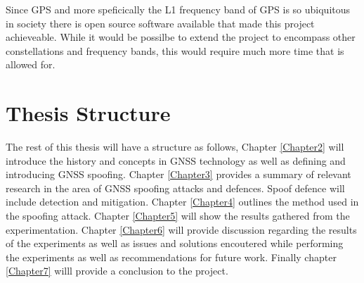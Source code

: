 Since GPS and more speficically the L1 frequency band of GPS is so ubiquitous in society there is open source software available that made this project achieveable. While
it would be possilbe to extend the project to encompass other constellations and frequency bands, this would require much more time that is allowed for.

\section{Thesis Structure}\label{sec:structure}
The rest of this thesis will have a structure as follows, Chapter \ref{Chapter2} will introduce the history and concepts in GNSS technology as well as defining and
introducing GNSS spoofing. Chapter \ref{Chapter3} provides a summary of relevant research in the area of GNSS spoofing attacks and defences. Spoof defence will include
detection and mitigation. Chapter \ref{Chapter4} outlines the method used in the spoofing attack. Chapter \ref{Chapter5} will show the results gathered from the
experimentation. Chapter \ref{Chapter6} will provide discussion regarding the results of the experiments as well as issues and solutions encoutered while performing the
experiments as well as recommendations for future work. Finally chapter \ref{Chapter7} willl provide a conclusion to the project.